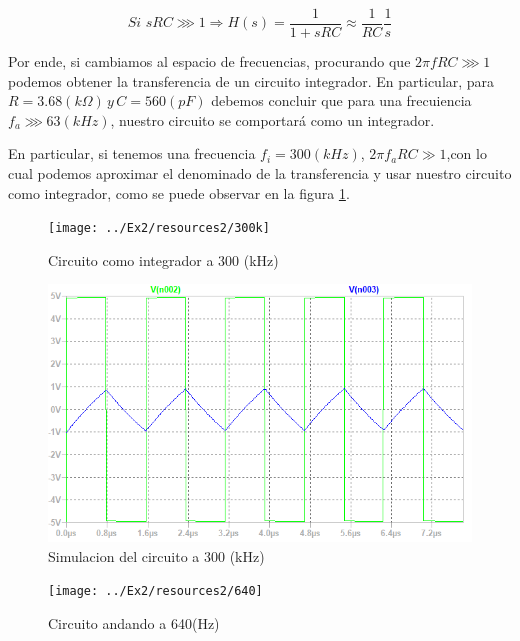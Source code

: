 \[
Si\,\,sRC\ggg1\Longrightarrow H(s)=\frac{1}{1+sRC}\approx\frac{1}{RC}\frac{1}{s}
\]

Por ende, si cambiamos al espacio de frecuencias, procurando que $2\pi fRC\ggg1$
podemos obtener la transferencia de un circuito integrador. En particular,
para $R=3.68(k\Omega)\,y\,C=560(pF)$ debemos concluir que para una
frecuiencia $f_{a}\ggg63(kHz)$, nuestro circuito se comportará como
un integrador.

En particular, si tenemos una frecuencia $f_{i}=300(kHz)$, $2\pi f_{a}RC\gg1$,con
lo cual podemos aproximar el denominado de la transferencia y usar
nuestro circuito como integrador, como se puede observar en la figura
\ref{2_6}.

\begin{figure}[H]
\begin{centering}
\texttt{[image: ../Ex2/resources2/300k]} 
\par\end{centering}
\caption{Circuito como integrador a 300 (kHz)}
\label{2_6}
\end{figure}

\begin{figure}[H]
\begin{centering}
\includegraphics[scale=0.6]{../Ex2/resources2/sim} 
\par\end{centering}
\caption{Simulacion del circuito a 300 (kHz)}
\end{figure}

\begin{figure}[H]
\begin{centering}
\texttt{[image: ../Ex2/resources2/640]} 
\par\end{centering}
\caption{Circuito andando a 640(Hz)}
\end{figure}
